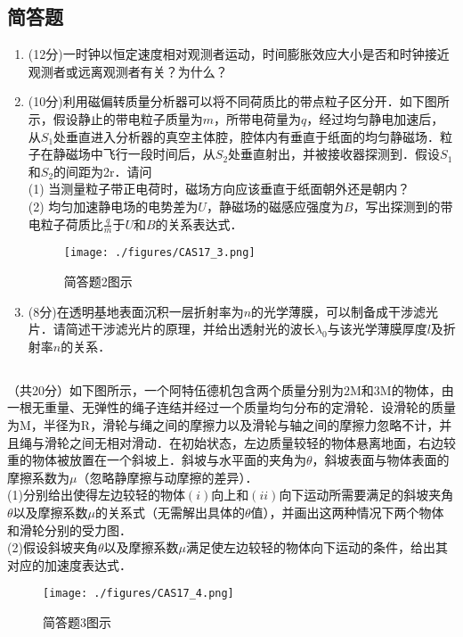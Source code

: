 \subsection{简答题}
\begin{enumerate}
\item (12分)一时钟以恒定速度相对观测者运动，时间膨胀效应大小是否和时钟接近观测者或远离观测者有关？为什么？
\item (10分)利用磁偏转质量分析器可以将不同荷质比的带点粒子区分开．如下图所示，假设静止的带电粒子质量为$m$，所带电荷量为$q$，经过均匀静电加速后，从$S_{1}$处垂直进入分析器的真空主体腔，腔体内有垂直于纸面的均匀静磁场．粒子在静磁场中飞行一段时间后，从$S_{2}$处垂直射出，并被接收器探测到．假设$S_{1}$和$S_{2}$的间距为2r．请问\\
(1) 当测量粒子带正电荷时，磁场方向应该垂直于纸面朝外还是朝内？\\
(2) 均匀加速静电场的电势差为$U$，静磁场的磁感应强度为$B$，写出探测到的带电粒子荷质比$\frac{q}{m}$于$U$和$B$的关系表达式．\\
\begin{figure}[ht]
\centering
\texttt{[image: ./figures/CAS17\_3.png]}
\caption{简答题2图示} \label{CAS17_fig3}
\end{figure}
\item (8分)在透明基地表面沉积一层折射率为$n$的光学薄膜，可以制备成干涉滤光片．请简述干涉滤光片的原理，并给出透射光的波长$\lambda_{0}$与该光学薄膜厚度$l$及折射率$n$的关系．
\end{enumerate}
\subsection{ }
（共20分）如下图所示，一个阿特伍德机包含两个质量分别为$2\mathrm{M}$和$3\mathrm{M}$的物体，由一根无重量、无弹性的绳子连结并经过一个质量均匀分布的定滑轮．设滑轮的质量为$\mathrm{M}$，半径为$\mathrm{R}$，滑轮与绳之间的摩擦力以及滑轮与轴之间的摩擦力忽略不计，并且绳与滑轮之间无相对滑动．在初始状态，左边质量较轻的物体悬离地面，右边较重的物体被放置在一个斜坡上．斜坡与水平面的夹角为$\theta$，斜坡表面与物体表面的摩擦系数为$\mu$（忽略静摩擦与动摩擦的差异）．\\
(1)分别给出使得左边较轻的物体$(i)$向上和$(ii)$向下运动所需要满足的斜坡夹角$\theta$以及摩擦系数$\mu$的关系式（无需解出具体的$\theta$值），并画出这两种情况下两个物体和滑轮分别的受力图．\\
(2)假设斜坡夹角$\theta$以及摩擦系数$\mu$满足使左边较轻的物体向下运动的条件，给出其对应的加速度表达式．\\
\begin{figure}[ht]
\centering
\texttt{[image: ./figures/CAS17\_4.png]}
\caption{简答题3图示} \label{CAS17_fig4}
\end{figure}
